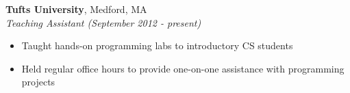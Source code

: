 \documentclass{article}
\newcommand{\affiliation}[4]{
  \textbf{#1}, #2\\
  \textit{#3 (#4)}
}
\newenvironment{achievements}{
  \begin{itemize}
  \setlength{\itemsep}{1pt}
  \setlength{\parsep}{0pt}
  }{
  \end{itemize}}
\begin{document}
\affiliation{Tufts University}
            {Medford, MA}
            {Teaching Assistant}
            {September 2012 - present}
\begin{achievements}
  \item Taught hands-on programming labs to introductory CS students
  \item Held regular office hours to provide one-on-one assistance with
        programming projects
\end{achievements}
\end{document}
